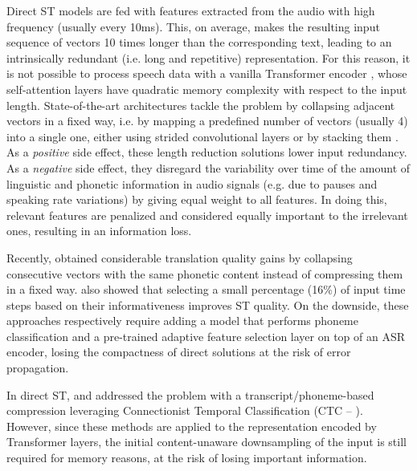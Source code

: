 \documentclass[11pt]{article}
\begin{document}
Direct ST models are fed with features extracted from the audio 
with high frequency (usually every 10ms).
This, on average, makes the resulting input sequence of vectors 10 times longer than the corresponding text,
leading to an intrinsically redundant (i.e. long and repetitive) representation.
For this reason, it is not possible to process speech data with a vanilla Transformer encoder \cite{transformer}, whose self-attention layers have quadratic memory complexity with respect to the input length.
State-of-the-art architectures tackle the problem by collapsing adjacent vectors in a fixed way, i.e. by mapping a predefined number of vectors (usually 4) into a single one, either using strided convolutional layers \cite{berard_2018,di-gangi-etal-2019-enhancing,wang-etal-2020-fairseq} or by stacking them \cite{sak2015fast}.
As a \textit{positive} side effect, these length reduction solutions
lower input redundancy. 
As a \textit{negative} side effect,
they disregard the variability over time of the amount of linguistic and phonetic information in audio signals (e.g. due to pauses and speaking rate variations) by giving equal weight to all features.
In doing this, relevant features are penalized and considered equally important to the irrelevant ones, resulting in an information loss.


Recently, \citet{salesky-etal-2019-exploring-ph} obtained considerable translation quality gains by collapsing consecutive vectors with the same phonetic content instead of compressing them in a fixed way.
\citet{zhang-etal-2020-adaptive} also showed that selecting a small percentage (16\%) of input time steps based on their informativeness improves ST quality. 
On the downside, these approaches respectively require adding a model that performs phoneme classification and a pre-trained adaptive feature selection layer on top of an ASR encoder, losing the compactness of direct solutions at the risk of error propagation.

In direct ST, \citet{liu2020bridging} and \citet{gaido-etal-2021-ctc} addressed the problem with a transcript/phoneme-based compression leveraging Connectionist Temporal Classification (CTC -- \citealt{Graves2006ConnectionistTC}).
However, since these methods are applied to the representation encoded by Transformer layers, the initial content-unaware downsampling of the input is still required for memory reasons, at the risk of losing important information.
\end{document}
